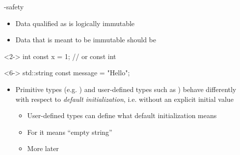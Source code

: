\begin{frame}[fragile]{-safety}

  \begin{itemize}
  \item Data qualified as  is logically immutable
  \item Data that is meant to be immutable should be 
  \end{itemize}

  \begin{codeblock}<2->{
int \alert{const} x = 1; // or const int
}\end{codeblock}

\begin{codeblock}<6->{
std::string \alert{const} message = "Hello";
}\end{codeblock}

  \begin{itemize}[<10->]
  \item Primitive types (e.g. ) and user-defined types such as
    ) behave differently with respect to \textit{default
      initialization}, i.e. without an explicit initial value
    \begin{itemize}
    \item User-defined types can define what default initialization means
    \item For  it means ``empty string''
    \item More later
    \end{itemize}
  \end{itemize}

\end{frame}

